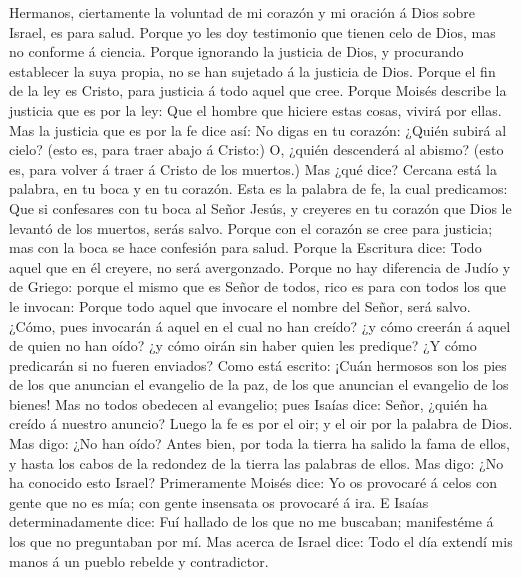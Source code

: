  Hermanos, ciertamente la voluntad de mi corazón y mi
oración á Dios sobre Israel, es para salud.  Porque yo les
doy testimonio que tienen celo de Dios, mas no conforme á ciencia.
 Porque ignorando la justicia de Dios, y procurando
establecer la suya propia, no se han sujetado á la justicia de Dios.
 Porque el fin de la ley es Cristo, para justicia á todo
aquel que cree.  Porque Moisés describe la justicia que es
por la ley: Que el hombre que hiciere estas cosas, vivirá por ellas.
 Mas la justicia que es por la fe dice así: No digas en tu
corazón: ¿Quién subirá al cielo? (esto es, para traer abajo á Cristo:)
 O, ¿quién descenderá al abismo? (esto es, para volver á
traer á Cristo de los muertos.)  Mas ¿qué dice? Cercana
está la palabra, en tu boca y en tu corazón. Esta es la palabra de fe,
la cual predicamos:  Que si confesares con tu boca al
Señor Jesús, y creyeres en tu corazón que Dios le levantó de los
muertos, serás salvo.  Porque con el corazón se cree para
justicia; mas con la boca se hace confesión para salud. 
Porque la Escritura dice: Todo aquel que en él creyere, no será
avergonzado.  Porque no hay diferencia de Judío y de
Griego: porque el mismo que es Señor de todos, rico es para con todos
los que le invocan:  Porque todo aquel que invocare el
nombre del Señor, será salvo.  ¿Cómo, pues invocarán á
aquel en el cual no han creído? ¿y cómo creerán á aquel de quien no han
oído? ¿y cómo oirán sin haber quien les predique?  ¿Y
cómo predicarán si no fueren enviados? Como está escrito: ¡Cuán hermosos
son los pies de los que anuncian el evangelio de la paz, de los que
anuncian el evangelio de los bienes!  Mas no todos
obedecen al evangelio; pues Isaías dice: Señor, ¿quién ha creído á
nuestro anuncio?  Luego la fe es por el oir; y el oir por
la palabra de Dios.  Mas digo: ¿No han oído? Antes bien,
por toda la tierra ha salido la fama de ellos, y hasta los cabos de la
redondez de la tierra las palabras de ellos.  Mas digo:
¿No ha conocido esto Israel? Primeramente Moisés dice: Yo os provocaré á
celos con gente que no es mía; con gente insensata os provocaré á ira.
 E Isaías determinadamente dice: Fuí hallado de los que
no me buscaban; manifestéme á los que no preguntaban por mí.
 Mas acerca de Israel dice: Todo el día extendí mis manos
á un pueblo rebelde y contradictor.

